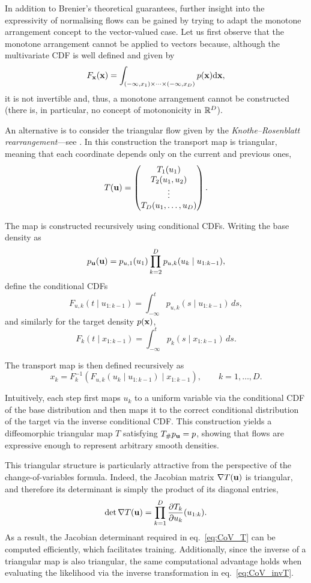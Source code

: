 In addition to Brenier's theoretical guarantees, further insight into the expressivity of normalising flows can be gained by trying to adapt the monotone arrangement concept to the vector-valued case. Let us first observe that the monotone arrangement cannot be applied to vectors because, although the multivariate CDF is well defined and given by 
\begin{equation}
    F_{ \mathbf{x}}({ \mathbf{x}}) = \int_{(-\infty,x_1)\times\cdots\times (-\infty,x_D)}p({ \mathbf{x}}){\text{d}}{ \mathbf{x}},
\end{equation}
it is not invertible and, thus, a monotone arrangement cannot be constructed (there is, in particular, no concept of motononicity in ${\mathbb R}^D$).

An alternative is to consider the triangular flow given by the \emph{Knothe--Rosenblatt rearrangement}---see \cite[Ch.~2]{villani2009optimal}. In this construction the
transport map is triangular, meaning that each coordinate depends
only on the current and previous ones,
\[
T({ \mathbf{u}})
=
\begin{pmatrix}
T_1(u_1)\\
T_2(u_1,u_2)\\
\vdots\\
T_D(u_1,\ldots,u_D)
\end{pmatrix}.
\]

The map is constructed recursively using conditional CDFs. Writing
the base density as
\[
p_{ \mathbf{u}}({ \mathbf{u}})
=
p_{u,1}(u_1)
\prod_{k=2}^D
p_{u,k}(u_k \mid u_{1:k-1}),
\]
define the conditional CDFs
\[
F_{u,k}(t \mid u_{1:k-1})
=
\int_{-\infty}^{t}
p_{u,k}(s \mid u_{1:k-1})\,ds,
\]
and similarly for the target density $p({ \mathbf{x}})$,
\[
F_k(t \mid x_{1:k-1})
=
\int_{-\infty}^{t}
p_k(s \mid x_{1:k-1})\,ds .
\]

The transport map is then defined recursively as
\[
x_k
=
F_k^{-1}\!\left(
F_{u,k}(u_k \mid u_{1:k-1})
\mid x_{1:k-1}
\right),
\qquad k=1,\ldots,D .
\]

Intuitively, each step first maps $u_k$ to a uniform variable via the
conditional CDF of the base distribution and then maps it to the
correct conditional distribution of the target via the inverse
conditional CDF. This construction yields a diffeomorphic triangular
map $T$ satisfying $T_\# p_{ \mathbf{u}} = p$, showing that flows are expressive
enough to represent arbitrary smooth densities.

This triangular structure is particularly attractive from the
perspective of the change-of-variables formula. Indeed, the Jacobian
matrix $\nabla T({ \mathbf{u}})$ is triangular, and therefore its determinant is
simply the product of its diagonal entries,
\[
\det \nabla T({ \mathbf{u}})
=
\prod_{k=1}^D
\frac{\partial T_k}{\partial u_k}(u_{1:k}).
\]
As a result, the Jacobian determinant required in
eq.~\eqref{eq:CoV_T} can be computed efficiently, which facilitates training. Additionally, since the inverse of a triangular map is also  triangular, the same computational advantage holds when evaluating the likelihood
via the inverse transformation in eq.~\eqref{eq:CoV_invT}.


